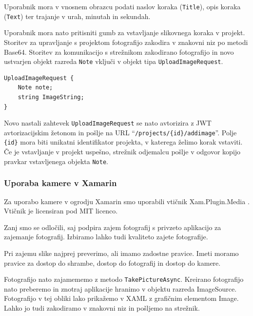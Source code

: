 \documentclass[a4paper, 12pt]{book}
\begin{document}
Uporabnik mora v vnosnem obrazcu podati naslov koraka (\texttt{Title}), opis koraka (\texttt{Text}) ter trajanje v urah, minutah in sekundah.

Uporabnik mora nato pritisniti gumb za vstavljanje slikovnega koraka v projekt.
Storitev za upravljanje s projektom fotografijo zakodira v znakovni niz po metodi Base64.
Storitev za komunikacijo s strežnikom zakodirano fotografijo in novo ustvarjen objekt razreda \texttt{Note} vključi v objekt tipa \texttt{UploadImageRequest}.

\begin{Verbatim}[commandchars=+\[\]]
UploadImageRequest {
    Note note;
    string ImageString; 
}
\end{Verbatim}

Novo nastali zahtevek \texttt{UploadImageRequest} se nato avtorizira z JWT avtorizacijskim žetonom in pošlje na URL \enquote{\texttt{/projects/\{id\}/addimage}}.
Polje \texttt{\{id\}} mora biti unikatni identifikator projekta, v katerega želimo korak vstaviti.
Če je vstavljanje v projekt uspešno, strežnik odjemalcu pošlje v odgovor kopijo pravkar vstavljenega objekta \texttt{Note}.


\subsubsection{Uporaba kamere v Xamarin}


Za uporabo kamere v ogrodju Xamarin smo uporabili vtičnik Xam.Plugin.Media \cite{xampluginmedia}.
Vtičnik je licensiran pod MIT licenco.

Zanj smo se odločili, saj podpira zajem fotografij s privzeto aplikacijo za zajemanje fotografij.
Izbiramo lahko tudi kvaliteto zajete fotografije.

Pri zajemu slike najprej preverimo, ali imamo zadostne pravice.
Imeti moramo pravice za dostop do shrambe, dostop do fotografij in dostop do kamere.

Fotografijo nato zajamememo z metodo \texttt{TakePictureAsync}.
Kreirano fotografijo nato preberemo in znotraj aplikacije hranimo v objektu razreda ImageSource.
Fotografijo v tej obliki lako prikažemo v XAML z grafičnim elementom Image.
Lahko jo tudi zakodiramo v znakovni niz in pošljemo na strežnik.


% 
% 
% 
\end{document}

